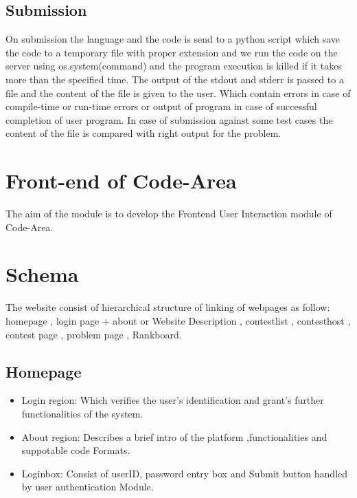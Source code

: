 \documentclass{article}
\begin{document}
\vspace{1.4cm}

\subsection{Submission}
On submission the language and the code is send to a python script which save the code to a temporary file with proper extension and we run the code on the server using os.system(command) and the program execution is killed if it takes more than the specified time. The output of the stdout and stderr is passed to a file and the content of the file is given to the user. Which contain errors in case of compile-time or run-time errors or output of program in case of successful completion of user program.
In case of submission against some test cases the content of the file is compared with right output for the problem.



\newpage

\section{Front-end of Code-Area}
The aim of the module is to develop the Frontend User Interaction module of Code-Area.

\section{Schema}
The website consist of hierarchical structure of linking of webpages as follow:
homepage , login page + about or Website Description , contestlist , contesthost , contest page , problem page , Rankboard.

\subsection{Homepage}
\begin{itemize}

\item Login region: Which verifies the user’s identification and grant’s further functionalities of the system.
\item About region: Describes a brief intro of the platform ,functionalities and suppotable code Formats.
\item Loginbox: Consist of userID, password entry box and Submit button handled by user authentication Module.

\end{itemize}
\end{document}
